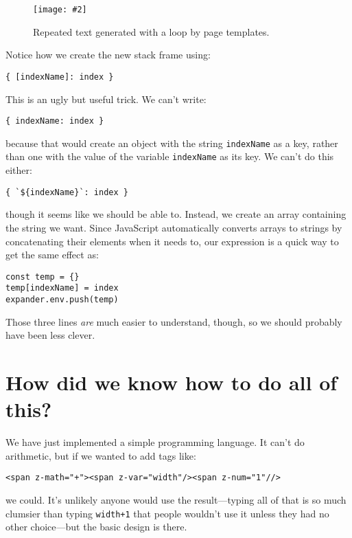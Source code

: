 \documentclass[krantzl]{krantz}
\newcommand{\figpdf}[4]{\begin{figure}%
\centering%
\texttt{[image: \#2]}%
\caption{#3}%
\label{#1}%
\end{figure}}
\begin{document}
\figpdf{page-templates-output-loop}{./page-templates/output-loop.pdf}{Repeated text generated with a loop by page templates.}{0.6}


Notice how we create the new stack frame using:

\begin{lstlisting}[frame=tblr]
{ [indexName]: index }
\end{lstlisting}


\noindent This is an ugly but useful trick.
We can’t write:

\begin{lstlisting}[frame=tblr]
{ indexName: index }
\end{lstlisting}


\noindent because that would create an object with the string \texttt{indexName} as a key,
rather than one with the value of the variable \texttt{indexName} as its key.
We can’t do this either:

\begin{lstlisting}[frame=tblr]
{ `${indexName}`: index }
\end{lstlisting}


\noindent though it seems like we should be able to.
Instead,
we create an array containing the string we want.
Since JavaScript automatically converts arrays to strings
by concatenating their elements when it needs to,
our expression is a quick way to get the same effect as:

\begin{lstlisting}[frame=tblr]
const temp = {}
temp[indexName] = index
expander.env.push(temp)
\end{lstlisting}


\noindent Those three lines \emph{are} much easier to understand, though,
so we should probably have been less clever.

\section{How did we know how to do all of this?}\label{page-templates-learning}


We have just implemented a simple programming language.
It can’t do arithmetic,
but if we wanted to add tags like:

\begin{lstlisting}[frame=tblr]
<span z-math="+"><span z-var="width"/><span z-num="1"//>
\end{lstlisting}


\noindent we could.
It’s unlikely anyone would use the result—typing all of that
is so much clumsier than typing \texttt{width+1} that people wouldn’t use it
unless they had no other choice—but the basic design is there.
\end{document}
